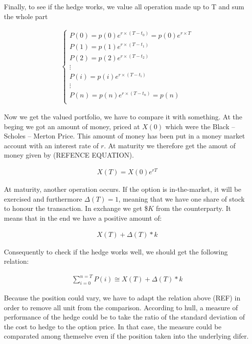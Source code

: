 \documentclass[12pt]{report}
\begin{document}
Finally, to see if the hedge works, we value all operation made up to T and sum the whole part

\begin{align}
 \left\{
  \begin{array}{l}
    P(0) = p(0) e ^{r \times (T - t_0)} = p(0) e ^{r \times T} \\
    P(1) = p(1) e ^{r \times (T - t_1)} \\
    P(2) = p(2) e ^{r \times (T - t_2)} \\
    \vdots \\
    P(i) = p(i) e ^{r \times (T - t_i)} \\
    \vdots \\
    P(n) = p(n) e ^{r \times (T - t_n)} = p(n) \\
  \end{array}
\right.
\end{align}

Now we get the valued portfolio, we have to compare it with something. At the beging we got an amount of money, priced at $X(0)$ which were the Black -- Scholes -- Merton Price. This amount of money has been put in a money market account with an interest rate of $r$. 
At maturity we therefore get the amout of money given by (REFENCE EQUATION).

\begin{align}
  X(T) = X(0)  e ^{r T}
\end{align}

At maturity, another operation occurs. If the option is in-the-market, it will be exercised and furthermore $\Delta(T) = 1$, meaning that we have one share of stock to honour the transaction. In exchange we get \$$K$ from the counterparty. It means that in the end we have a positive amount of:

\begin{align}
  X(T) + \Delta(T) * k
\end{align}

Consequently to check if the hedge works well, we should get the following relation:

\begin{align}
 \sum_{i = 0}^{n = T} P(i) \cong X(T) + \Delta(T) * k
\end{align}

Because the position could vary, we have to adapt the relation above (REF) in order to remove all unit from the comparison.
According to hull, a measure of performance of the hedge could be to take the ratio of the standard deviation of the cost to hedge to the option price. In that case, the measure could be comparated among themselve even if the position taken into the underlying difer.
\end{document}
